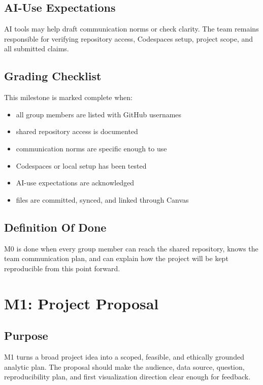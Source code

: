 \documentclass[
  letterpaper,
  DIV=11,
  numbers=noendperiod,
  oneside]{scrreprt}
\providecommand{\tightlist}{%
  \setlength{\itemsep}{0pt}\setlength{\parskip}{0pt}}
\begin{document}
\section{AI-Use Expectations}\label{ai-use-expectations-1}

AI tools may help draft communication norms or check clarity. The team
remains responsible for verifying repository access, Codespaces setup,
project scope, and all submitted claims.

\section{Grading Checklist}\label{grading-checklist}

This milestone is marked complete when:

\begin{itemize}
\tightlist
\item
  all group members are listed with GitHub usernames
\item
  shared repository access is documented
\item
  communication norms are specific enough to use
\item
  Codespaces or local setup has been tested
\item
  AI-use expectations are acknowledged
\item
  files are committed, synced, and linked through Canvas
\end{itemize}

\section{Definition Of Done}\label{definition-of-done-3}

M0 is done when every group member can reach the shared repository,
knows the team communication plan, and can explain how the project will
be kept reproducible from this point forward.

\chapter{M1: Project Proposal}\label{m1-project-proposal}

\section{Purpose}\label{purpose-2}

M1 turns a broad project idea into a scoped, feasible, and ethically
grounded analytic plan. The proposal should make the audience, data
source, question, reproducibility plan, and first visualization
direction clear enough for feedback.
\end{document}
